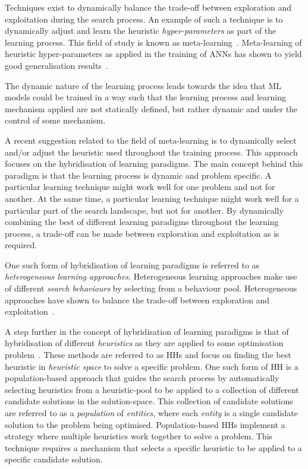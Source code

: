 Techniques exist to dynamically balance the trade-off between exploration and exploitation during the search process. An example of such a technique is to dynamically adjust and learn the heuristic \textit{hyper-parameters} as part of the learning process. This field of study is known as meta-learning~\cite{ref:giraud:2004}. Meta-learning of heuristic hyper-parameters as applied in the training of \acp{ANN} has shown to yield good generalisation results~\cite{ref:hospedales:2020, ref:vilalta:2002}.

The dynamic nature of the learning process leads towards the idea that \acs{ML} models could be trained in a way such that the learning process and learning mechanism applied are not statically defined, but rather dynamic and under the control of some mechanism.

A recent suggestion related to the field of meta-learning is to dynamically select and/or adjust the heuristic used throughout the training process. This approach focuses on the hybridisation of learning paradigms. The main concept behind this paradigm is that the learning process is dynamic and problem specific. A particular learning technique might work well for one problem and not for another. At the same time, a particular learning technique might work well for a particular part of the search landscape, but not for another. By dynamically combining the best of different learning paradigms throughout the learning process, a trade-off can be made between exploration and exploitation as is required.

One such form of hybridisation of learning paradigms is referred to as \textit{heterogeneous learning approaches}. Heterogeneous learning approaches make use of different \textit{search behaviours} by selecting from a behaviour pool. Heterogeneous approaches have shown to balance the trade-off between exploration and exploitation~\cite{ref:nepomuceno:2013}.

A step further in the concept of hybridisation of learning paradigms is that of hybridisation of different \textit{heuristics} as they are applied to some optimisation problem~\cite{ref:burke:2013}. These methods are referred to as \acfp{HH} and focus on finding the best heuristic in \textit{heuristic space} to solve a specific problem. One such form of \acs{HH} is a population-based approach that guides the search process by automatically selecting heuristics from a heuristic-pool to be applied to a collection of different candidate solutions in the solution-space. This collection of candidate solutions are referred to as a \textit{population} of \textit{entities}, where each \textit{entity} is a single candidate solution to the problem being optimised. Population-based \acp{HH} implement a strategy where multiple heuristics work together to solve a problem. This technique requires a mechanism that selects a specific heuristic to be applied to a specific candidate solution.

